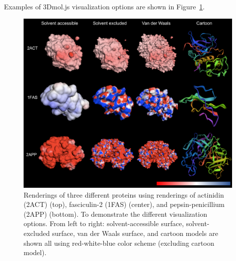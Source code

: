 \documentclass[12pt,titlepage]{article}
\begin{document}
Examples of 3Dmol.js visualization options are shown in Figure~\ref{fig:features}.
\begin{figure}
	\begin{center}
		\includegraphics[width=.75\paperwidth]{features.png}
		\caption{Renderings of three different proteins using renderings of actinidin (2ACT) (top), fasciculin-2 (1FAS) (center), and pepsin-penicillium (2APP) (bottom).
		To demonstrate the different visualization options.
		From left to right: solvent-accessible surface, solvent-excluded surface, van der Waals  surface, and cartoon models are shown all using red-white-blue color scheme (excluding cartoon model). \label{fig:features}}  
	\end{center}  
\end{figure}
\end{document}
